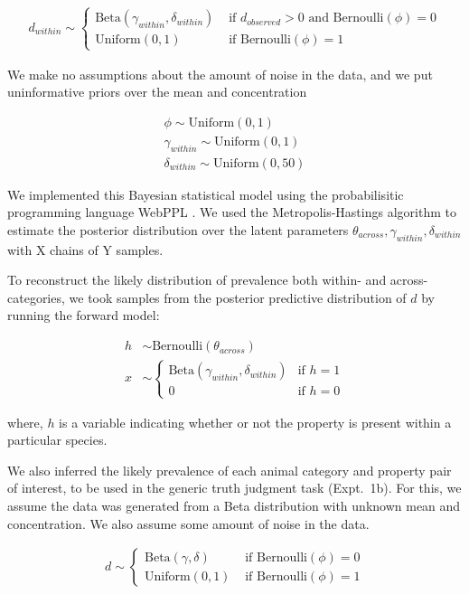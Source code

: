 \documentclass[10pt,letterpaper]{article}
\begin{document}
\begin{align*}
d_{within} \sim \begin{cases}
					\text{Beta}(\gamma_{within}, \delta_{within})  &  \mbox{ if } d_{observed} > 0 \text{ and }  \text{Bernoulli} (\phi) = 0 \\
					\text{Uniform}(0,1) & \mbox{ if } \text{Bernoulli} (\phi) = 1
				\end{cases}
\end{align*}

We make no assumptions about the amount of noise in the data, and we put uninformative priors over the mean and concentration 

\begin{align*}
 \phi \sim \text{Uniform}(0,1) \\
\gamma_{within} \sim \text{Uniform}(0,1) \\
\delta_{within} \sim \text{Uniform}(0,50)
\end{align*}

We implemented this Bayesian statistical model using the probabilisitic programming language WebPPL \cite{dippl}. We used the Metropolis-Hastings algorithm to estimate the posterior distribution over the latent parameters $\theta_{across}, \gamma_{within}, \delta_{within}$ with X chains of Y samples.

To reconstruct the likely distribution of  prevalence both within- and across- categories, we took samples from the posterior predictive distribution of $d$ by running the forward model: 

\begin{align*}
h & \sim \text{Bernoulli}(\theta_{across}) \\
x & \sim \begin{cases} 
		\text{Beta}(\gamma_{within}, \delta_{within}) &\mbox{if } h = 1 \\ 
				0 & \mbox{if } h=0
				\end{cases} 
\end{align*}

where, $h$ is a variable indicating whether or not the property is present within a particular species. 


We also inferred the likely prevalence of each animal category and property pair of interest, to be used in the generic truth judgment task (Expt.~1b). 
For this, we assume the data was generated from a Beta distribution with unknown mean and concentration. 
We also assume some amount of noise in the data.

\begin{align*}
d \sim \begin{cases}
					\text{Beta}(\gamma, \delta)  &  \mbox{ if } \text{Bernoulli} (\phi) = 0 \\
					\text{Uniform}(0,1) & \mbox{ if } \text{Bernoulli} (\phi) = 1
				\end{cases}
\end{align*}
\end{document}
